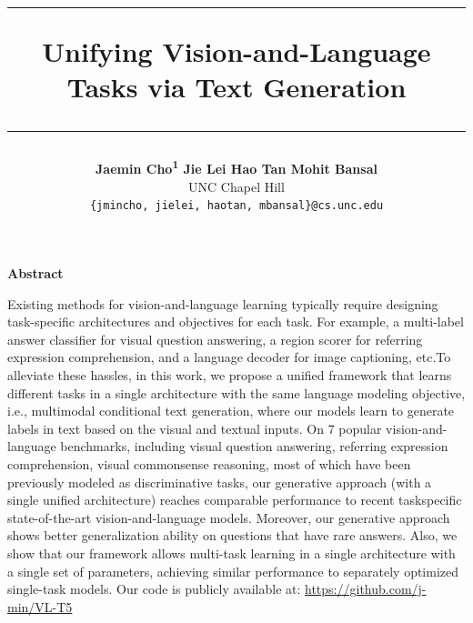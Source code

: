\documentclass[twocolumn,3p,a4paper,preprint,11pt,margin=2.5cm]{elsarticle}
\title{
\vspace{-20mm} %
    \hrule height 1.5pt \vspace{8mm} %
    \textbf{Unifying Vision-and-Language Tasks via Text Generation}
    \vspace{8mm} %
    \hrule height 1.5pt %
    \vspace{3mm} %
}
\author{
    \textbf{Jaemin Cho\textsuperscript{\textnormal{1}}\hspace{0.2cm} Jie Lei\hspace{0.2cm} Hao Tan\hspace{0.2cm} Mohit Bansal}\\
UNC Chapel Hill\\
\textcolor[gray]{0.5}{\texttt{\{jmincho, jielei, haotan, mbansal\}@cs.unc.edu}}
}
\date{}
\begin{document}
\maketitle




\begin{center}
 \Large{\textbf{Abstract}}\\
\end{center}
Existing methods for vision-and-language learning typically require designing 
task-specific architectures and objectives for each task. For example, a multi-label answer classifier for visual question answering, a region scorer for referring
expression comprehension, and a language decoder for image captioning, etc.To alleviate these hassles, in this work, we propose a unified framework that learns different tasks in a single architecture with the same language modeling objective, i.e., multimodal conditional text generation, where our models learn to generate
labels in text based on the visual and textual inputs. On 7 popular vision-and-language benchmarks, including visual question answering, referring expression comprehension, visual commonsense reasoning, most of which have been previously modeled as discriminative tasks, our generative approach (with a single unified architecture) reaches comparable performance to recent taskspecific state-of-the-art vision-and-language models. Moreover, our generative approach shows better generalization ability on questions that have rare answers. Also, we show that our framework allows multi-task learning in a single architecture with a single set of parameters, achieving similar performance to separately optimized single-task models. Our code is publicly available at: \href{https://github.com/j-min/VL-T5}{https://github.com/j-min/VL-T5}
\end{document}
